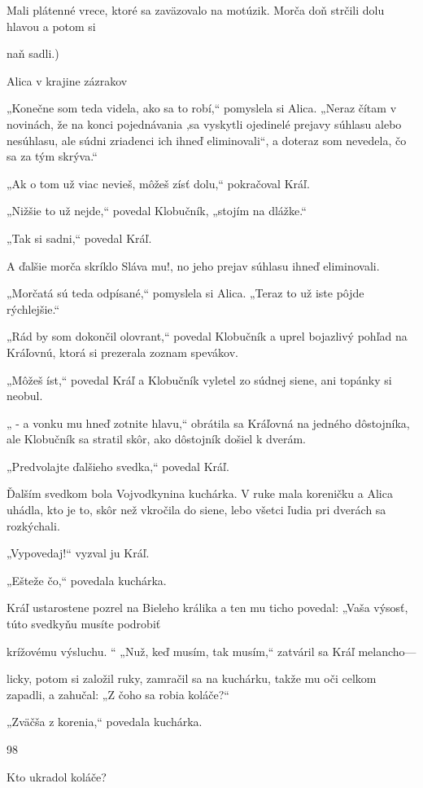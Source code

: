 \documentclass[12pt]{book}
\begin{document}
\begin{Parallel}[p]{}{}
{Mali plátenné vrece, ktoré sa
zaväzovalo na motúzik.
Morča doň strčili dolu
hlavou a potom si

naň sadli.)

 

Alica v krajine zázrakov

„Konečne som teda videla, ako sa to robí,“ pomyslela si
Alica. „Neraz čítam v novinách, že na konci pojednávania
,sa vyskytli ojedinelé prejavy súhlasu alebo nesúhlasu, ale
súdni zriadenci ich ihneď eliminovali“, a doteraz som
nevedela, čo sa za tým skrýva.“

„Ak o tom už viac nevieš, môžeš zísť dolu,“ pokračoval
Kráľ.

„Nižšie to už nejde,“ povedal Klobučník, „stojím na
dlážke.“

„Tak si sadni,“ povedal Kráľ.

A ďalšie morča skríklo Sláva mu!, no jeho prejav súhlasu
ihneď eliminovali.

„Morčatá sú teda odpísané,“ pomyslela si Alica. „Teraz
to už iste pôjde rýchlejšie.“

„Rád by som dokončil olovrant,“ povedal Klobučník
a uprel bojazlivý pohľad na Kráľovnú, ktorá si prezerala
zoznam spevákov.

„Môžeš íst,“ povedal Kráľ a Klobučník vyletel zo súdnej
siene, ani topánky si neobul.

„ - a vonku mu hneď zotnite hlavu,“ obrátila sa Kráľovná
na jedného dôstojníka, ale Klobučník sa stratil skôr, ako
dôstojník došiel k dverám.

„Predvolajte ďalšieho svedka,“ povedal Kráľ.

Ďalším svedkom bola Vojvodkynina kuchárka. V ruke
mala koreničku a Alica uhádla, kto je to, skôr než vkročila
do siene, lebo všetci ľudia pri dverách sa rozkýchali.

„Vypovedaj!“ vyzval ju Kráľ.

„Ešteže čo,“ povedala kuchárka.

Kráľ ustarostene pozrel na Bieleho králika a ten mu ticho
povedal: „Vaša výsosť, túto svedkyňu musíte podrobiť

krížovému výsluchu. “
„Nuž, keď musím, tak musím,“ zatváril sa Kráľ melancho—

licky, potom si založil ruky, zamračil sa na kuchárku, takže
mu oči celkom zapadli, a zahučal: „Z čoho sa robia
koláče?“

„Zväčša z korenia,“ povedala kuchárka.

98

Kto ukradol koláče?

}
\end{Parallel}
\end{document}
